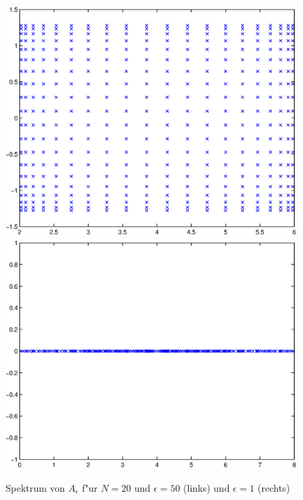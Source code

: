 \begin{figure}
\includegraphics[scale=0.35]{eps/speke50n20.eps}
\hfill
\includegraphics[scale=0.35]{eps/speke1n20.eps}
\caption{Spektrum von $A_{\epsilon}$ f"ur $N=20$ und $\epsilon = 50$ (links)
und $\epsilon = 1$ (rechts)}
\end{figure}

